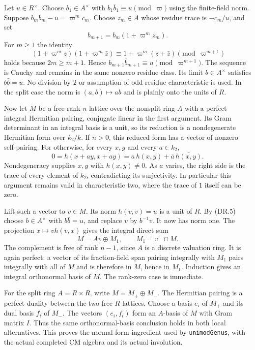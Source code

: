 Let $u\in R^\times$. Choose $b_1\in A^\times$ with
$b_1\bar b_1\equiv u\pmod\varpi$ using the finite-field norm.
Suppose $b_m\bar b_m-u=\varpi^m c_m$. Choose $z_m\in A$
whose residue trace is $-c_m/u$, and set
\[
                    b_{m+1}=b_m(1+\varpi^m z_m).
 \tag{DR.5}
\]
For $m\ge1$ the identity
\[
 (1+\varpi^m z)(1+\varpi^m\bar z)
       \equiv1+\varpi^m(z+\bar z)\pmod{\varpi^{m+1}}
 \tag{DR.6}
\]
holds because $2m\ge m+1$. Hence
$b_{m+1}\bar b_{m+1}\equiv u\pmod{\varpi^{m+1}}$.
The sequence is Cauchy and remains in the same nonzero residue class.
Its limit $b\in A^\times$ satisfies $b\bar b=u$.
No division by $2$ or assumption of odd residue characteristic is
used. In the split case the norm is $(a,b)\mapsto ab$ and is
plainly onto the units of $R$.

Now let $M$ be a free rank-$n$ lattice over the nonsplit ring $A$
with a perfect integral Hermitian pairing, conjugate linear in the
first argument. Its Gram determinant in an integral basis is a unit,
so its reduction is a nondegenerate Hermitian form over $k_2/k$.
If $n>0$, this reduced form has a vector of nonzero self-pairing.
For otherwise, for every $x,y$ and every $a\in k_2$,
\[
 0=h(x+ay,x+ay)=a\,h(x,y)+\bar a\,\overline{h(x,y)}.
 \tag{DR.7}
\]
Nondegeneracy supplies $x,y$ with $h(x,y)\ne0$. As $a$ varies,
the right side is the trace of every element of $k_2$, contradicting
its surjectivity. In particular this argument remains valid in
characteristic two, where the trace of $1$ itself can be zero.

Lift such a vector to $v\in M$. Its norm $h(v,v)=u$ is a unit
of $R$. By (DR.5) choose $b\in A^\times$ with $b\bar b=u$,
and replace $v$ by $b^{-1}v$. It now has norm one. The projection
$x\mapsto v h(v,x)$ gives the integral direct sum
\[
             M=Av\oplus M_1,\qquad M_1=v^\perp\cap M.
 \tag{DR.8}
\]
The complement is free of rank $n-1$, since $A$ is a discrete
valuation ring. It is again perfect: a vector of its fraction-field
span pairing integrally with $M_1$ pairs integrally with all of $M$
and is therefore in $M$, hence in $M_1$. Induction gives an integral
orthonormal basis of $M$. The rank-zero case is immediate.

For the split ring $A=R\times R$, write $M=M_+\oplus M_-$.
The Hermitian pairing is a perfect duality between the two free
$R$-lattices. Choose a basis $e_i$ of $M_+$ and its dual basis
$f_i$ of $M_-$. The vectors $(e_i,f_i)$ form an $A$-basis of $M$
with Gram matrix $I$. Thus the same orthonormal-basis conclusion
holds in both local alternatives. This proves the normal-form
ingredient used by \texttt{unimodGenus}, with the actual completed
CM algebra and its actual involution.

